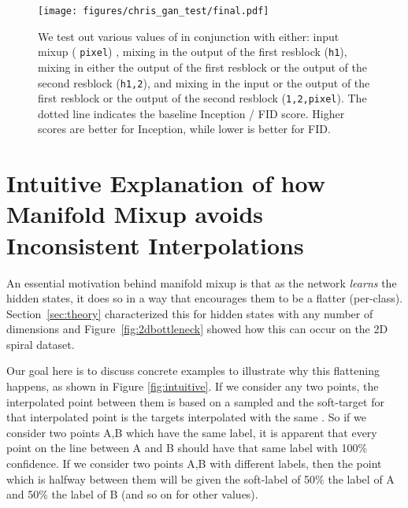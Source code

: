 \documentclass{article} \usepackage[preprint]{nips_2018}
\begin{document}
{\begin{figure}[H]
  \centering
  \texttt{[image: figures/chris\_gan\_test/final.pdf]}
  
  \caption{We test out various values of  in conjunction with either: input mixup ( \texttt{pixel}) \citep{zhang2017mixup}, mixing in the output of the first resblock (\texttt{h1}), mixing in either the output  of the first resblock or the output of the second resblock (\texttt{h1,2}), and mixing in the input or the output of the first resblock or the output of the second resblock (\texttt{1,2,pixel}). The dotted line indicates the baseline Inception / FID score. Higher scores are better for Inception, while lower is better for FID.}
  \label{fig:appendix:gan_barplots}
\end{figure}


\section{Intuitive Explanation of how Manifold Mixup avoids Inconsistent Interpolations}
\label{appendix:sec:collision}
An essential motivation behind manifold mixup is that as the network \textit{learns} the hidden states, it does so in a way that encourages them to be a flatter (per-class).  Section~\ref{sec:theory} characterized this for hidden states with any number of dimensions and Figure~\ref{fig:2dbottleneck} showed how this can occur on the 2D spiral dataset.  

Our goal here is to discuss concrete examples to illustrate why this flattening happens, as shown in Figure \ref{fig:intuitive}.  If we consider any two points, the interpolated point between them is based on a sampled  and the soft-target for that interpolated point is the targets interpolated with the same .  So if we consider two points A,B which have the same label, it is apparent that every point on the line between A and B should have that same label with 100\% confidence.  If we consider two points A,B with different labels, then the point which is halfway between them will be given the soft-label of 50\% the label of A and 50\% the label of B (and so on for other  values).  

}
\end{document}
